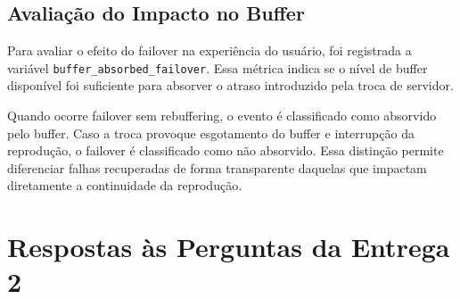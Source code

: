 \documentclass[
    12pt,
    a4paper,
    oneside
]{article}
\begin{document}
\subsection{Avaliação do Impacto no Buffer}

Para avaliar o efeito do failover na experiência do usuário, foi registrada a variável \texttt{buffer\_absorbed\_failover}. Essa métrica indica se o nível de buffer disponível foi suficiente para absorver o atraso introduzido pela troca de servidor.

Quando ocorre failover sem rebuffering, o evento é classificado como absorvido pelo buffer. Caso a troca provoque esgotamento do buffer e interrupção da reprodução, o failover é classificado como não absorvido. Essa distinção permite diferenciar falhas recuperadas de forma transparente daquelas que impactam diretamente a continuidade da reprodução.


\section{Respostas às Perguntas da Entrega 2}

\begingroup
\sloppy  %
\end{document}
